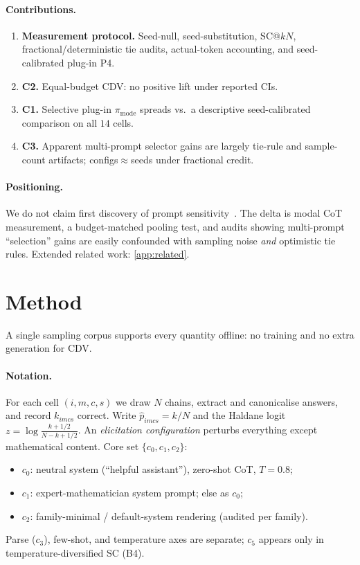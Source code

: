 \documentclass{article}
\newcommand{\pmode}{\pi_{\mathrm{mode}}}
\newcommand{\phat}{\hat{p}}
\theoremstyle{plain}
\theoremstyle{definition}
\theoremstyle{remark}
\begin{document}
\paragraph{Contributions.}
\begin{enumerate}\itemsep1pt
  \item \textbf{Measurement protocol.} Seed-null, seed-substitution, SC@$kN$,
    fractional/deterministic tie audits, actual-token accounting, and
    seed-calibrated plug-in P4.
  \item \textbf{C2.} Equal-budget CDV: no positive lift under reported CIs.
  \item \textbf{C1.} Selective plug-in $\pmode$ spreads vs.\ a descriptive
    seed-calibrated comparison on all $14$ cells.
  \item \textbf{C3.} Apparent multi-prompt selector gains are largely
    tie-rule and sample-count artifacts; configs$\approx$seeds under
    fractional credit.
\end{enumerate}

\paragraph{Positioning.}
We do not claim first discovery of prompt
sensitivity~\citep{brittlebench2026,tee2026,prompteval2024,sclar2024formatspread}.
The delta is modal CoT measurement, a budget-matched pooling test, and audits
showing multi-prompt ``selection'' gains are easily confounded with sampling
noise \emph{and} optimistic tie rules. Extended related work:
\cref{app:related}.

\section{Method}
\label{sec:method}

A single sampling corpus supports every quantity offline: no training and no
extra generation for CDV.

\paragraph{Notation.}
For each cell $(i,m,c,s)$ we draw $N$ chains, extract and canonicalise answers,
and record $k_{imcs}$ correct. Write $\phat_{imcs}=k/N$ and the Haldane logit
$z=\log\frac{k+1/2}{N-k+1/2}$. An \emph{elicitation configuration} perturbs
everything except mathematical content. Core set $\{c_0,c_1,c_2\}$:
\begin{itemize}\itemsep1pt
  \item $c_0$: neutral system (``helpful assistant''), zero-shot CoT, $T{=}0.8$;
  \item $c_1$: expert-mathematician system prompt; else as $c_0$;
  \item $c_2$: family-minimal / default-system rendering (audited per family).
\end{itemize}
Parse ($c_3$), few-shot, and temperature axes are separate; $c_5$ appears only in
temperature-diversified SC (B4).
\end{document}
